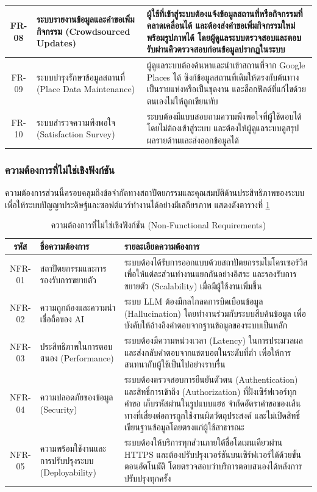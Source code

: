 \begin{longtable}{|c|p{4cm}|p{7cm}|}
FR-08 & ระบบรายงานข้อมูลและคำขอเพิ่มกิจกรรม (Crowdsourced Updates) & ผู้ใช้ที่เข้าสู่ระบบต้องแจ้งข้อมูลสถานที่หรือกิจกรรมที่คลาดเคลื่อนได้ และต้องส่งคำขอเพิ่มกิจกรรมใหม่พร้อมรูปภาพได้ โดยผู้ดูแลระบบตรวจสอบและตอบรับผ่านคิวตรวจสอบก่อนข้อมูลปรากฏในระบบ \\ \hline
FR-09 & ระบบบำรุงรักษาข้อมูลสถานที่ (Place Data Maintenance) & ผู้ดูแลระบบต้องค้นหาและนำเข้าสถานที่จาก Google Places ได้ ซิงก์ข้อมูลสถานที่เดิมให้ตรงกับต้นทางเป็นรายแห่งหรือเป็นชุดงาน และล็อกฟิลด์ที่แก้ไขด้วยตนเองไม่ให้ถูกเขียนทับ \\ \hline
FR-10 & ระบบสำรวจความพึงพอใจ (Satisfaction Survey) & ระบบต้องมีแบบสอบถามความพึงพอใจที่ผู้ใช้ตอบได้โดยไม่ต้องเข้าสู่ระบบ และต้องให้ผู้ดูแลระบบดูสรุปผลรายด้านและส่งออกข้อมูลได้ \\
\hline
\end{longtable}

\subsubsection{ความต้องการที่ไม่ใช่เชิงฟังก์ชัน}

ความต้องการส่วนนี้ครอบคลุมถึงข้อจำกัดทางสถาปัตยกรรมและคุณสมบัติด้านประสิทธิภาพของระบบ เพื่อให้ระบบปัญญาประดิษฐ์และซอฟต์แวร์ทำงานได้อย่างมีเสถียรภาพ แสดงดังตารางที่ \ref{tab:nonfunc_req}

\begin{table}[H]
\centering
\caption{ความต้องการที่ไม่ใช่เชิงฟังก์ชัน (Non-Functional Requirements)}
\label{tab:nonfunc_req}
\begin{tabular}{|c|p{4cm}|p{7cm}|}
\hline
\textbf{รหัส} & \textbf{ชื่อความต้องการ} & \textbf{รายละเอียดความต้องการ} \\
\hline
NFR-01 & สถาปัตยกรรมและการรองรับการขยายตัว & ระบบต้องได้รับการออกแบบด้วยสถาปัตยกรรมไมโครเซอร์วิส เพื่อให้แต่ละส่วนทำงานแยกกันอย่างอิสระ และรองรับการขยายตัว (Scalability) เมื่อมีผู้ใช้งานเพิ่มขึ้น \\ \hline
NFR-02 & ความถูกต้องและความน่าเชื่อถือของ AI & ระบบ LLM ต้องมีกลไกลดการบิดเบือนข้อมูล (Hallucination) โดยทำงานร่วมกับระบบสืบค้นข้อมูล เพื่อบังคับให้อ้างอิงคำตอบจากฐานข้อมูลของระบบเป็นหลัก \\ \hline
NFR-03 & ประสิทธิภาพในการตอบสนอง (Performance) & ระบบต้องมีความหน่วงเวลา (Latency) ในการประมวลผลและส่งกลับคำตอบจากแชตบอตในระดับที่ต่ำ เพื่อให้การสนทนากับผู้ใช้เป็นไปอย่างราบรื่น \\ \hline
NFR-04 & ความปลอดภัยของข้อมูล (Security) & ระบบต้องตรวจสอบการยืนยันตัวตน (Authentication) และสิทธิ์การเข้าถึง (Authorization) ที่ฝั่งเซิร์ฟเวอร์ทุกคำขอ เก็บรหัสผ่านในรูปแบบแฮช จำกัดอัตราคำขอของเส้นทางที่เสี่ยงต่อการถูกใช้งานผิดวัตถุประสงค์ และไม่เปิดสิทธิ์เขียนฐานข้อมูลโดยตรงแก่ผู้ใช้สาธารณะ \\ \hline
NFR-05 & ความพร้อมใช้งานและการปรับปรุงระบบ (Deployability) & ระบบต้องให้บริการทุกส่วนภายใต้ชื่อโดเมนเดียวผ่าน HTTPS และต้องปรับปรุงเวอร์ชันบนเซิร์ฟเวอร์ได้ด้วยขั้นตอนอัตโนมัติ โดยตรวจสอบว่าบริการตอบสนองได้หลังการปรับปรุงทุกครั้ง \\
\hline
\end{tabular}
\end{table}

